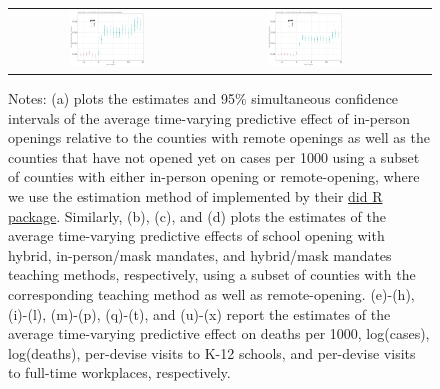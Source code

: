 \documentclass[9pt,twocolumn,twoside,lineno]{pnas-new}
\begin{document}
\begin{figure}[!ht]
{\begin{minipage}{\linewidth}
\begin{tabular}{cccc}
 \includegraphics[width=0.4\textwidth]{event_fullwork_csfullno.pdf}& \includegraphics[width=0.4\textwidth]{event_fullwork_cshybridno.pdf}  \smallskip\\
\end{tabular}
  \end{minipage}}
\vspace{-0.2cm}  {\scriptsize
\begin{flushleft}
Notes: (a) plots the estimates and 95\% simultaneous confidence intervals of  the average time-varying predictive effect of in-person openings relative to the counties with remote openings as well as the counties that have not opened yet on cases per 1000 using a subset of counties with either in-person opening or remote-opening, where we use the estimation method of \cite{Callaway2020} implemented by their \href{https://cran.r-project.org/web/packages/did/vignettes/did-basics.html}{did R package}.  Similarly, (b), (c), and (d) plots the estimates of  the average time-varying predictive effects of school opening with hybrid, in-person/mask mandates, and hybrid/mask mandates teaching methods, respectively, using a subset of counties with the corresponding teaching method as well as remote-opening. (e)-(h), (i)-(l), (m)-(p), (q)-(t), and (u)-(x) report the estimates of the average time-varying predictive effect on deaths per 1000, log(cases), log(deaths), per-devise visits to K-12 schools, and per-devise visits to full-time workplaces, respectively.  \end{flushleft}} \vspace{-0.5cm}
\end{figure}
 
\end{document}
